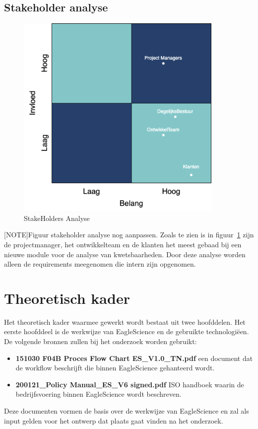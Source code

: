\subsection{Stakeholder analyse}\label{subsec:stakeholder-analyse1}
\begin{figure}[H]
    \myfloatalign
    \includegraphics[width=10cm]{gfx/stakeholderanalyse}
    \caption{StakeHolders Analyse}
    \label{fig:StakeholderAnalyse1}
\end{figure}
[NOTE]Figuur stakeholder analyse nog aanpassen.
Zoals te zien is in figuur~\ref{fig:StakeholderAnalyse1} zijn de projectmanager, het ontwikkelteam en de klanten het meest gebaad bij een nieuwe module voor de analyse van kwetsbaarheden.
Door deze analyse worden alleen de requirements meegenomen die intern zijn opgenomen.


\section{Theoretisch kader}\label{sec:theoretisch-kader}

Het theoretisch kader waarmee gewerkt wordt bestaat uit twee hoofddelen. Het eerste hoofddeel is de werkwijze van EagleScience en de gebruikte technologiëen. De volgende bronnen zullen bij het onderzoek worden gebruikt:
\begin{itemize}
    \item \textbf{151030 F04B Proces Flow Chart ES\_V1.0\_TN.pdf} een document dat de workflow beschrijft die binnen EagleScience gehanteerd wordt.
    \item \textbf{200121\_Policy Manual\_ES\_V6 signed.pdf} ISO handboek waarin de bedrijfsvoering binnen EagleScience wordt beschreven.
\end{itemize}
Deze documenten vormen de basis over de werkwijze van EagleScience en zal als input gelden voor het ontwerp dat plaats gaat vinden na het onderzoek.

